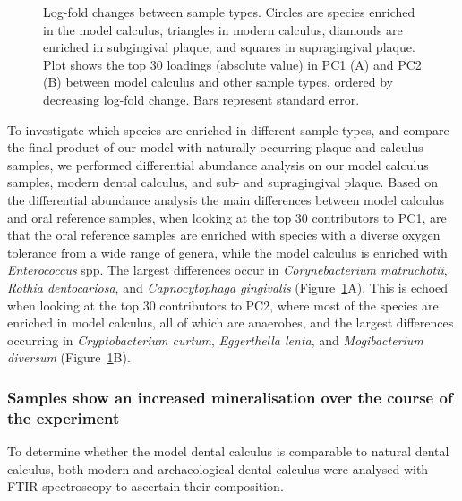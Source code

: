 \documentclass[10pt,a4paper]{article}
\begin{document}
\begin{figure}


\caption{\label{fig-diffabund-comp}Log-fold changes between sample
types. Circles are species enriched in the model calculus, triangles in
modern calculus, diamonds are enriched in subgingival plaque, and
squares in supragingival plaque. Plot shows the top 30 loadings
(absolute value) in PC1 (A) and PC2 (B) between model calculus and other
sample types, ordered by decreasing log-fold change. Bars represent
standard error.}

\end{figure}%

To investigate which species are enriched in different sample types, and
compare the final product of our model with naturally occurring plaque
and calculus samples, we performed differential abundance analysis on
our model calculus samples, modern dental calculus, and sub- and
supragingival plaque. Based on the differential abundance analysis the
main differences between model calculus and oral reference samples, when
looking at the top 30 contributors to PC1, are that the oral reference
samples are enriched with species with a diverse oxygen tolerance from a
wide range of genera, while the model calculus is enriched with
\emph{Enterococcus} spp. The largest differences occur in
\emph{Corynebacterium matruchotii}, \emph{Rothia dentocariosa}, and
\emph{Capnocytophaga gingivalis} (Figure~\ref{fig-diffabund-comp}A).
This is echoed when looking at the top 30 contributors to PC2, where
most of the species are enriched in model calculus, all of which are
anaerobes, and the largest differences occurring in
\emph{Cryptobacterium curtum}, \emph{Eggerthella lenta}, and
\emph{Mogibacterium diversum} (Figure~\ref{fig-diffabund-comp}B).

\subsubsection{Samples show an increased mineralisation over the course
of the
experiment}\label{samples-show-an-increased-mineralisation-over-the-course-of-the-experiment}

To determine whether the model dental calculus is comparable to natural
dental calculus, both modern and archaeological dental calculus were
analysed with FTIR spectroscopy to ascertain their composition.
\end{document}
